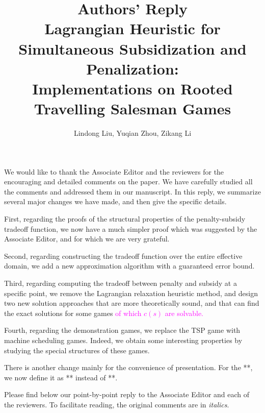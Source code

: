 \documentclass[11pt]{article}
\title{\textbf{Authors' Reply\\Lagrangian Heuristic for Simultaneous Subsidization and Penalization:\\
Implementations on Rooted Travelling Salesman Games}}
\author{Lindong Liu, Yuqian Zhou, Zikang Li}
\date{}
\begin{document}
\maketitle
\noindent
We would like to thank the Associate Editor and the reviewers for the encouraging and detailed comments on the paper. We have carefully studied all the comments and addressed them in our manuscript.
In this reply, we summarize several major changes we have made, and then give the specific details.


First, regarding the proofs of the structural properties of the penalty-subsidy tradeoff function, we now have a much simpler proof which was suggested by the Associate Editor, and for which we are very grateful.

Second, regarding constructing the tradeoff function over the entire effective domain, we add a new approximation algorithm with a guaranteed error bound.

Third, regarding computing the tradeoff between penalty and subsidy at a specific point, we remove the Lagrangian relaxation heuristic method, and design two new solution approaches that are more theoretically sound, and that can find the exact solutions for some games \textcolor{magenta}{of which $c(s)$ are solvable.}


Fourth, regarding the demonstration games, we replace the TSP game with machine scheduling games. Indeed, we obtain some interesting properties by studying the special structures of these games.

There is another change mainly for the convenience of presentation. For the **, we now define it as ** instead of **.

Please find below our point-by-point reply to the Associate Editor and each of the reviewers. To facilitate reading, the original comments are in {\it italics}.
\end{document}
